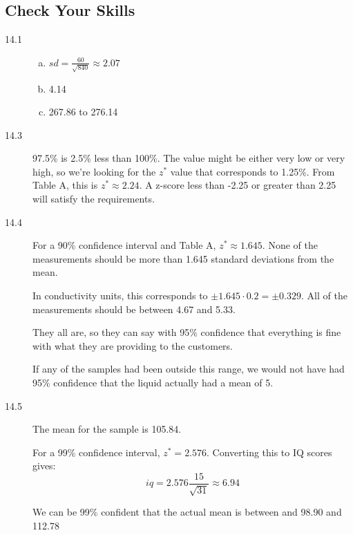 \documentclass[letterpaper, landscape]{exam}
\begin{document}
  \subsection{Check Your Skills}
  \begin{description}
    \item[14.1] 
      \begin{enumerate}[(a)]

        \item $ sd = \frac{60}{\sqrt{840}} \approx 2.07$

        \item 4.14

        \item 267.86 to 276.14

      \end{enumerate}

    \item[14.3] 97.5\% is 2.5\% less than 100\%. The value might be either very low
      or very high, so we're looking for the $z^*$ value that corresponds to
      1.25\%. From Table A, this is $z^* \approx 2.24$. A z-score less than
      -2.25 or greater than 2.25 will satisfy the requirements.

    \item[14.4]
      For a 90\% confidence interval and Table A, $z^* \approx 1.645$. None of
      the measurements should be more than 1.645 standard deviations from the
      mean.

      In conductivity units, this corresponds to $\pm 1.645 \cdot 0.2 = \pm
      0.329$. All of the measurements should be between 4.67 and 5.33.

      They all are, so they can say with 95\% confidence that everything is
      fine with what they are providing to the customers.

      If any of the samples had been outside this range, we would not have had
      95\% confidence that the liquid actually had a mean of 5.

    \item[14.5]
      The mean for the sample is 105.84. 

      For a 99\% confidence interval, $z^* = 2.576$. Converting this to IQ
      scores gives:
      \[
        iq = 2.576 \frac{15}{\sqrt{31}} \approx 6.94
      \]

      We can be 99\% confident that the actual mean is between and 98.90 and 112.78

    \end{description}
\end{document}
